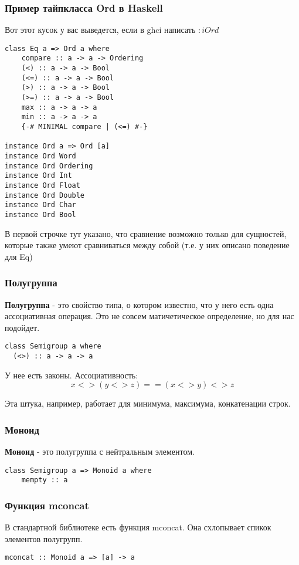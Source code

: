 \documentclass[10pt, a4paper]{article}
\begin{document}
\subsubsection{Пример тайпкласса Ord в Haskell}
Вот этот кусок у вас выведется, если в ghci написать $:i Ord$

\begin{lstlisting}
class Eq a => Ord a where
    compare :: a -> a -> Ordering
    (<) :: a -> a -> Bool
    (<=) :: a -> a -> Bool
    (>) :: a -> a -> Bool
    (>=) :: a -> a -> Bool
    max :: a -> a -> a
    min :: a -> a -> a
    {-# MINIMAL compare | (<=) #-}

instance Ord a => Ord [a] 
instance Ord Word 
instance Ord Ordering 
instance Ord Int 
instance Ord Float 
instance Ord Double 
instance Ord Char 
instance Ord Bool 

\end{lstlisting}

В первой строчке тут указано, что сравнение возможно только для сущностей, которые также умеют сравниваться между собой (т.е. у них описано поведение для Eq)


\subsubsection{Полугруппа}

{\bf Полугруппа} - это свойство типа, о котором известно, что у него есть одна ассоциативная операция. Это не совсем матичетическое определение, но для нас подойдет.

\begin{lstlisting}
class Semigroup a where
  (<>) :: a -> a -> a
\end{lstlisting}

У нее есть законы. Ассоциативность:
	$$x <> (y <> z) == (x <> y) <> z$$
	
Эта штука, например, работает для минимума, максимума, конкатенации строк.

\subsubsection{Моноид}
{\bf Моноид} - это полугруппа с нейтральным элементом.

\begin{lstlisting}
class Semigroup a => Monoid a where
	mempty :: a
\end{lstlisting}

\subsubsection{Функция mconcat}
В стандартной библиотеке есть функция mconcat. Она схлопывает спикок элементов полугрупп.
\begin{lstlisting}
mconcat :: Monoid a => [a] -> a
\end{lstlisting}
\end{document}
